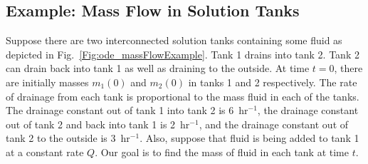 \subsection{Example: Mass Flow in Solution Tanks}

Suppose there are two interconnected solution tanks containing some fluid as depicted in Fig.~\ref{Fig:ode_massFlowExample}. Tank 1 drains into tank 2. Tank 2 can drain back into tank 1 as well as draining to the outside. At time $t = 0$, there are initially masses $m_1(0)$ and $m_2(0)$ in tanks 1 and 2 respectively. The rate of drainage from each tank is proportional to the mass fluid in each of the tanks. The drainage constant out of tank 1 into tank 2 is 6~hr$^{-1}$, the drainage constant out of tank 2 and back into tank 1 is 2~hr$^{-1}$, and the drainage constant out of tank 2 to the outside is 3~hr${}^{-1}$. Also, suppose that fluid is being added to tank 1 at a constant rate $Q$. Our goal is to find the mass of fluid in each tank at time $t$.

